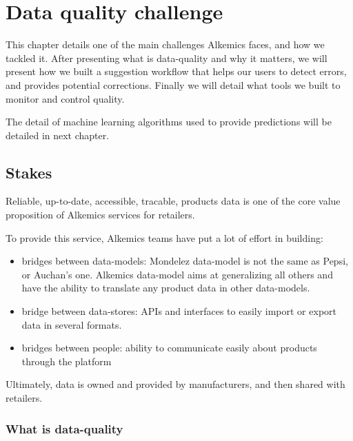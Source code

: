 \chapter{Data quality challenge}

This chapter details one of the main challenges Alkemics faces, and how we tackled it. 
After presenting what is data-quality and why it matters, we will present how we built a suggestion workflow that helps our users to detect errors, and provides potential corrections. Finally we will detail what tools we built to monitor and control quality.

The detail of machine learning algorithms used to provide predictions will be detailed in next chapter.

\section{Stakes}

Reliable, up-to-date, accessible, tracable, products data is one of the core value proposition of Alkemics services for retailers.

To provide this service, Alkemics teams have put a lot of effort in building:

\begin{itemize}
	\item bridges between data-models: Mondelez data-model is not the same as Pepsi, or Auchan's one. Alkemics data-model aims at generalizing all others and have the ability to translate any product data in other data-models.
	\item bridge between data-stores: APIs and interfaces to easily import or export data in several formats.
	\item bridges between people: ability to communicate easily about products through the platform
\end{itemize} 

Ultimately, data is owned and provided by manufacturers, and then shared with retailers.

\subsection{What is data-quality}

